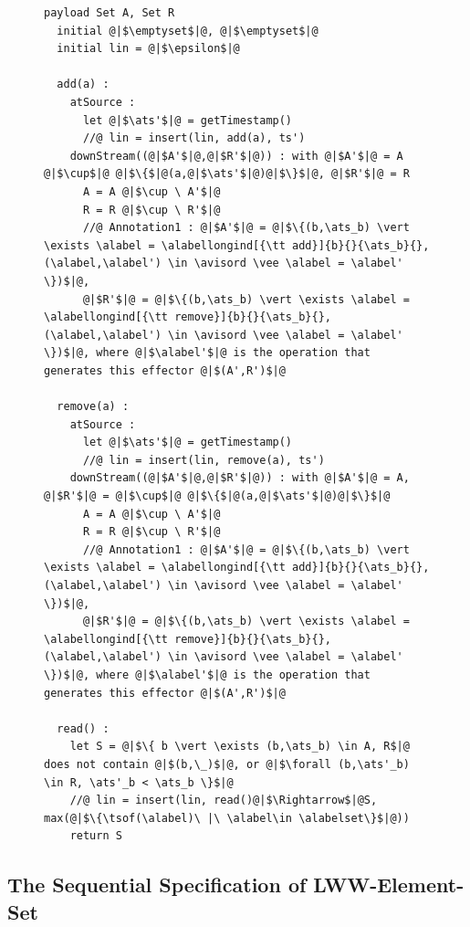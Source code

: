\begin{figure}[t]
\begin{lstlisting}[frame=top,caption={Pseudo-code of LWW-element-set},
captionpos=b,label={lst:LWW-element-set}]
  payload Set A, Set R
  initial @|$\emptyset$|@, @|$\emptyset$|@
  initial lin = @|$\epsilon$|@

  add(a) :
    atSource :
      let @|$\ats'$|@ = getTimestamp()
      //@ lin = insert(lin, add(a), ts')
    downStream((@|$A'$|@,@|$R'$|@)) : with @|$A'$|@ = A @|$\cup$|@ @|$\{$|@(a,@|$\ats'$|@)@|$\}$|@, @|$R'$|@ = R
      A = A @|$\cup \ A'$|@
      R = R @|$\cup \ R'$|@
      //@ Annotation1 : @|$A'$|@ = @|$\{(b,\ats_b) \vert \exists \alabel = \alabellongind[{\tt add}]{b}{}{\ats_b}{}, (\alabel,\alabel') \in \avisord \vee \alabel = \alabel' \})$|@,  
      @|$R'$|@ = @|$\{(b,\ats_b) \vert \exists \alabel = \alabellongind[{\tt remove}]{b}{}{\ats_b}{}, (\alabel,\alabel') \in \avisord \vee \alabel = \alabel' \})$|@, where @|$\alabel'$|@ is the operation that generates this effector @|$(A',R')$|@ 

  remove(a) :
    atSource :
      let @|$\ats'$|@ = getTimestamp()
      //@ lin = insert(lin, remove(a), ts')
    downStream((@|$A'$|@,@|$R'$|@)) : with @|$A'$|@ = A, @|$R'$|@ = @|$\cup$|@ @|$\{$|@(a,@|$\ats'$|@)@|$\}$|@
      A = A @|$\cup \ A'$|@
      R = R @|$\cup \ R'$|@
      //@ Annotation1 : @|$A'$|@ = @|$\{(b,\ats_b) \vert \exists \alabel = \alabellongind[{\tt add}]{b}{}{\ats_b}{}, (\alabel,\alabel') \in \avisord \vee \alabel = \alabel' \})$|@,
      @|$R'$|@ = @|$\{(b,\ats_b) \vert \exists \alabel = \alabellongind[{\tt remove}]{b}{}{\ats_b}{}, (\alabel,\alabel') \in \avisord \vee \alabel = \alabel' \})$|@, where @|$\alabel'$|@ is the operation that generates this effector @|$(A',R')$|@ 

  read() :
    let S = @|$\{ b \vert \exists (b,\ats_b) \in A, R$|@ does not contain @|$(b,\_)$|@, or @|$\forall (b,\ats'_b) \in R, \ats'_b < \ats_b \}$|@
    //@ lin = insert(lin, read()@|$\Rightarrow$|@S, max(@|$\{\tsof(\alabel)\ |\ \alabel\in \alabelset\}$|@)) 
    return S
\end{lstlisting}
\end{figure}



\subsection{The Sequential Specification of LWW-Element-Set}
\label{subsec:the sequential specification of LWW-element-set}

